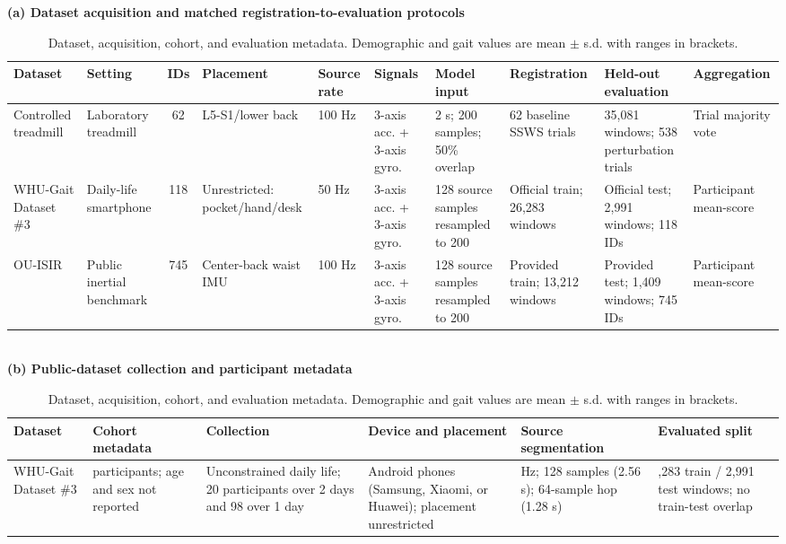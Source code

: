 \begin{table}[t]
\caption{Dataset, acquisition, cohort, and evaluation metadata. Demographic and gait values are mean $\pm$ s.d. with ranges in brackets.}
\label{tab:datasets_protocols}
\centering
\scriptsize
\setlength{\tabcolsep}{2.5pt}
\renewcommand{\arraystretch}{1.07}
\textbf{(a) Dataset acquisition and matched registration-to-evaluation protocols}\\[2pt]
\begin{adjustbox}{max width=\textwidth}
\begin{tabular}{llclllllll}
\toprule
Dataset & Setting & IDs & Placement & Source rate & Signals & Model input & Registration & Held-out evaluation & Aggregation \\
\midrule
Controlled treadmill & Laboratory treadmill & 62 & L5-S1/lower back & 100 Hz & 3-axis acc. + 3-axis gyro. & 2 s; 200 samples; 50\% overlap & 62 baseline SSWS trials & 35,081 windows; 538 perturbation trials & Trial majority vote \\
WHU-Gait Dataset \#3 & Daily-life smartphone & 118 & Unrestricted: pocket/hand/desk & 50 Hz & 3-axis acc. + 3-axis gyro. & 128 source samples resampled to 200 & Official train; 26,283 windows & Official test; 2,991 windows; 118 IDs & Participant mean-score \\
OU-ISIR & Public inertial benchmark & 745 & Center-back waist IMU & 100 Hz & 3-axis acc. + 3-axis gyro. & 128 source samples resampled to 200 & Provided train; 13,212 windows & Provided test; 1,409 windows; 745 IDs & Participant mean-score \\
\bottomrule
\end{tabular}
\end{adjustbox}\\[4pt]
\textbf{(b) Public-dataset collection and participant metadata}\\[2pt]
\begin{tabular}{@{}>{\raggedright\arraybackslash}p{3.0cm}>{\raggedright\arraybackslash}p{4.4cm}>{\raggedright\arraybackslash}p{4.5cm}>{\raggedright\arraybackslash}p{4.5cm}>{\raggedright\arraybackslash}p{3.9cm}>{\raggedright\arraybackslash}p{3.9cm}@{}}
\toprule
Dataset & Cohort metadata & Collection & Device and placement & Source segmentation & Evaluated split \\
\midrule
WHU-Gait Dataset \#3 & 118 participants; age and sex not reported & Unconstrained daily life; 20 participants over 2 days and 98 over 1 day & Android phones (Samsung, Xiaomi, or Huawei); placement unrestricted & 50 Hz; 128 samples (2.56 s); 64-sample hop (1.28 s) & 26,283 train / 2,991 test windows; no train-test overlap \\

\end{tabular}
\end{table}
